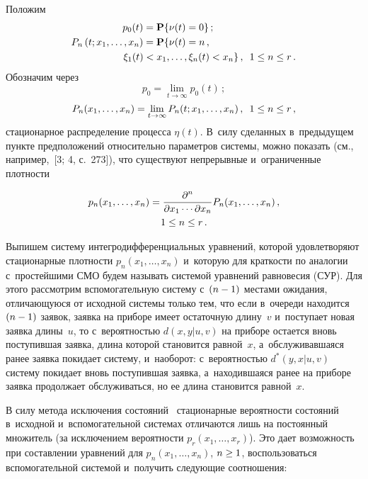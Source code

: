 \begin{multicols}{2}
Положим 
\begin{align*}
p_{0}(t)&= \mathbf{P}\{\nu(t)=0\}\,;
\\
P_{n}\left(t;x_1,\ldots,x_{n}\right) &=
\mathbf{P}\{\nu(t)=n\,,\\
&\hspace*{-20pt}\xi_{1}(t)<x_{1},\ldots,\xi_{n}(t)<x_{n}\}
\,,\enskip 1 \le n \le r\,.
\end{align*}
Обозначим через
\begin{equation*}
p_{0} = \lim\limits_{t\to\infty}
p_{0}(t) \,;
\end{equation*}
\begin{equation*}
P_{n}(x_1,\ldots,x_{n}) = \lim\limits_{t\to\infty}
P_{n}(t;x_1,\ldots,x_{n}) \,,\enskip 1 \le n \le r\,,
\end{equation*}
стационарное распределение процесса $\eta(t)$.
В~силу сделанных в~предыдущем пункте
предположений относительно параметров системы,
можно показать (см., например,~[3; 4, с.~273]), что существуют
непрерывные и~ограниченные плотности 

\noindent
\begin{multline*}
p_n(x_1,\ldots,x_{n}) = \displaystyle\frac{\displaystyle \partial^n \mathstrut}{\displaystyle \partial x_1\cdots \partial x_n\mathstrut}
P_n(x_1,\ldots,x_{n}) \,,\\[-1pt]
1 \le n \le r\,.
\end{multline*}

Выпишем систему интегродифференциальных
уравнений, которой удовлетворяют стационарные
плотности $p_n(x_1,\ldots,x_{n})$ и~которую
для краткости по аналогии с~простейшими СМО будем называть системой уравнений
равновесия (СУР). Для этого рассмотрим вспомогательную систему
с~$(n\hm-1)$ мес\-та\-ми ожидания, отличающуюся от исходной
сис\-те\-мы только тем, что если в~очереди
находится $(n\hm-1)$ заявок, заявка на приборе имеет
остаточную длину~$v$ и~поступает новая заявка
длины~$u$, то с~ве\-ро\-ят\-ностью $d(x,y|u,v)$ на
приборе остается вновь поступившая заявка,
длина которой становится равной~$x$, а~обслуживавшаяся ранее заявка покидает
сис\-те\-му, и~наоборот: с~вероятностью $d^*(y,x|u,v)$ систему покидает вновь
поступившая заявка, а~находившаяся ранее на приборе заявка продолжает обслуживаться, но
ее длина становится равной~$x$.

В силу метода исключения состояний~\cite{ppav}
стационарные вероятности состояний в~исходной
и~вспомогательной системах отличаются лишь на
постоянный множитель (за исключением вероятности $p_{r}(x_1,\ldots,x_{r})$).
Это дает возможность при составлении
уравнений для $p_n(x_1,\ldots,x_{n})$, $n\hm\ge 1$,
воспользоваться вспомогательной системой и~получить следующие соотношения:


\end{multicols}

